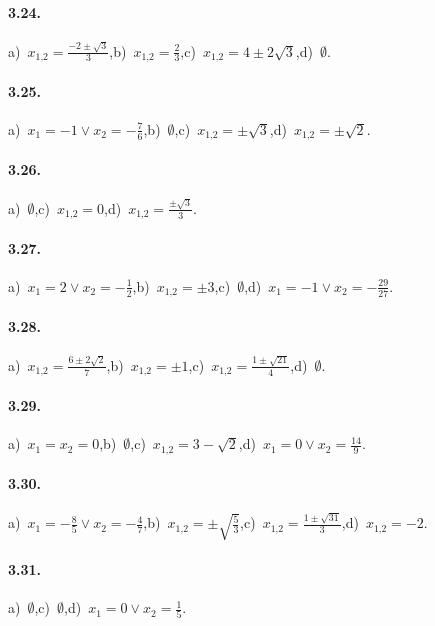 \paragraph{3.24.} a)~$x_{1\text{,}2} = \frac{- 2 \pm \sqrt{3}}{3}$,\quad b)~$x_{1\text{,}2} = \frac{2}{3}$,\quad c)~$x_{1\text{,}2} = 4 \pm 2 \sqrt{3}$,\quad d)~$\emptyset$.

\paragraph{3.25.} a)~$x_{1} =-1 \vee x_{2} =-\frac{7}{6}$,\quad b)~$\emptyset$,\quad c)~$x_{1\text{,}2} = \pm \sqrt{3}$,\quad d)~$x_{1\text{,}2} =\pm \sqrt{2}$.

\paragraph{3.26.} a)~$\emptyset$,\quad c)~$x_{1\text{,}2}= 0$,\quad d)~$x_{1\text{,}2} = \frac{\pm \sqrt{3}}{3}$.

\paragraph{3.27.} a)~$x_{1} = 2 \vee x_{2} =-\frac{1}{2}$,\quad b)~$x_{1\text{,}2} =\pm 3$,\quad c)~$\emptyset$,\quad d)~$x_{1} =-1 \vee x_{2} =-\frac{29}{27}$.

\paragraph{3.28.} a)~$x_{1\text{,}2} = \frac{6 \pm 2 \sqrt{2}}{7}$,\quad b)~$x_{1\text{,}2} =\pm 1$,\quad c)~$x_{1\text{,}2} = \frac{1 \pm \sqrt{21}}{4}$,\quad d)~$\emptyset$.

\paragraph{3.29.} a)~$x_{1} = x_{2} = 0$,\quad b)~$\emptyset$,\quad c)~$x_{1\text{,}2}= 3-\sqrt{2}$,\quad d)~$x_{1} = 0 \vee x_{2} = \frac{14}{9}$.

\paragraph{3.30.} a)~$x_{1} =-\frac{8}{5} \vee x_{2} =-\frac{4}{7}$,\quad b)~$x_{1\text{,}2} = \pm \sqrt{\frac{5}{3}}$,\quad c)~$x_{1\text{,}2} = \frac{1 \pm \sqrt{31}}{3}$,\quad d)~$x_{1\text{,}2}=-2$.

\paragraph{3.31.} a)~$\emptyset$,\quad c)~$\emptyset$,\quad d)~$x_{1} = 0 \vee x_{2} = \frac{1}{5}$.

